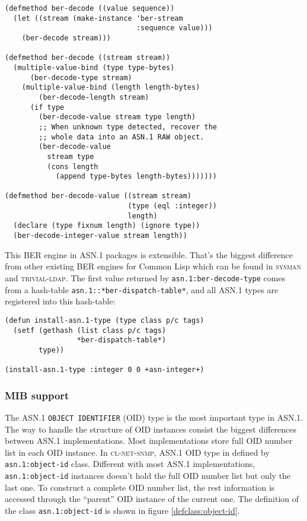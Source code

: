 \documentclass[reprint,natbib,9pt]{sigplanconf}
\begin{document}
\begin{verbatim}
(defmethod ber-decode ((value sequence))
  (let ((stream (make-instance 'ber-stream
                               :sequence value)))
    (ber-decode stream)))

(defmethod ber-decode ((stream stream))
  (multiple-value-bind (type type-bytes)
      (ber-decode-type stream)
    (multiple-value-bind (length length-bytes)
        (ber-decode-length stream)
      (if type
        (ber-decode-value stream type length)
        ;; When unknown type detected, recover the
        ;; whole data into an ASN.1 RAW object.
        (ber-decode-value
          stream type
          (cons length
            (append type-bytes length-bytes)))))))

(defmethod ber-decode-value ((stream stream)
                             (type (eql :integer))
                             length)
  (declare (type fixnum length) (ignore type))
  (ber-decode-integer-value stream length))
\end{verbatim}

This BER engine in ASN.1 packages is extensible. That's the biggest
difference from other existing BER engines for Common Lisp which can be
found in \textsc{sysman} and \textsc{trivial-ldap}.  The first
value returned by \texttt{asn.1:ber-decode-type} comes from a
hash-table \texttt{asn.1::*ber-dispatch-table*}, and all ASN.1 types
are registered into this hash-table:

\begin{verbatim}
(defun install-asn.1-type (type class p/c tags)
  (setf (gethash (list class p/c tags)
                 *ber-dispatch-table*)
        type))

(install-asn.1-type :integer 0 0 +asn-integer+)
\end{verbatim}

\subsubsection{MIB support}

The ASN.1 \texttt{OBJECT IDENTIFIER} (OID) type is the most important
type in ASN.1.
The way to handle the structure of OID instances
consist the biggest differences between ASN.1 implementations.
Most implementations store full OID number list in each OID
instance.
In \textsc{cl-net-snmp}, ASN.1 OID type in defined by
\texttt{asn.1:object-id} class. Different with most ASN.1 implementations,
\texttt{asn.1:object-id} instances doesn't hold the full OID number list
but only the last one. To construct
a complete OID number list, the rest information is accessed through
the ``parent'' OID instance of the current one. The definition of the
class \texttt{asn.1:object-id} is shown in figure \ref{defclass:object-id}.
\end{document}
